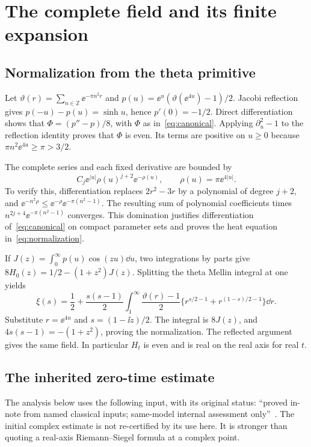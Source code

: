 \section{The complete field and its finite expansion}\label{sec:expansion}

\subsection{Normalization from the theta primitive}

Let $\vartheta(r)=\sum_{n\in\mathbb Z}\ee^{-\pi n^2r}$ and
$p(u)=\ee^u(\vartheta(\ee^{4u})-1)/2$.
Jacobi reflection~\cite{DLMF} gives $p(-u)-p(u)=\sinh u$, hence $p'(0)=-1/2$.
Direct differentiation shows that $\Phi=(p''-p)/8$, with $\Phi$ as
in~\eqref{eq:canonical}. Applying $\partial_u^2-1$ to the reflection
identity proves that $\Phi$ is even. Its terms are positive on $u\ge0$
because $\pi n^2\ee^{4u}\ge\pi>3/2$.

The complete series and each fixed derivative are bounded by
\[
 C_j\ee^{|u|}\rho(u)^{j+2}\ee^{-\rho(u)},\qquad
 \rho(u)=\pi\ee^{4|u|}.
\]
To verify this, differentiation replaces $2r^2-3r$ by a polynomial
of degree $j+2$, and
$\ee^{-n^2\rho}\le\ee^{-\rho}\ee^{-\pi(n^2-1)}$.
The resulting sum of polynomial coefficients times
$n^{2j+4}\ee^{-\pi(n^2-1)}$ converges. This domination justifies
differentiation of~\eqref{eq:canonical} on compact parameter sets and
proves the heat equation in~\eqref{eq:normalization}.

If $J(z)=\int_0^\infty p(u)\cos(zu)\dd u$, two integrations by
parts give $8H_0(z)=1/2-(1+z^2)J(z)$. Splitting the theta Mellin
integral at one yields
\[
 \xi(s)=\frac12+\frac{s(s-1)}2\int_1^\infty
 \frac{\vartheta(r)-1}{2}
 \{r^{s/2-1}+r^{(1-s)/2-1}\}\dd r.
\]
Substitute $r=\ee^{4u}$ and $s=(1-\ii z)/2$. The integral is
$8J(z)$, and $4s(s-1)=-(1+z^2)$, proving the normalization.
The reflected argument gives the same field. In particular $H_t$ is
even and is real on the real axis for real $t$.

\subsection{The inherited zero-time estimate}

The analysis below uses the following input, with its original status:
``proved in-note from named classical inputs; same-model internal
assessment only''~\cite{HDAComplex,HDAAssessment}. The initial complex
estimate is not re-certified by its use here. It is stronger than
quoting a real-axis Riemann--Siegel formula at a complex point.

